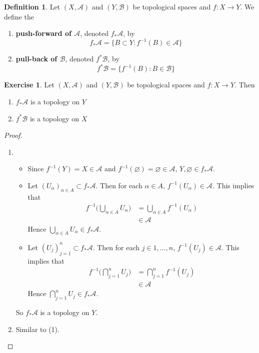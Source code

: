 \documentclass[12pt]{amsart}
\theoremstyle{definition}
\newtheorem{defn}[definition]{Definition}
\newtheorem{ex}[definition]{Exercise}
\newcommand{\al}{\alpha}
\newcommand{\MA}{\mathcal{A}}
\newcommand{\MB}{\mathcal{B}}
\newcommand{\lex}[1]{\label{ex:#1}}
\newcommand{\ld}[1]{\label{defn:#1}}
\begin{document}
	\begin{defn} \ld{}
	Let $(X, \MA)$ and $(Y,\MB)$ be topological spaces and $f: X \rightarrow Y$. We define the 
	\begin{enumerate}
	\item \textbf{push-forward of $\MA$}, denoted $f_*\MA$, by 
	$$f_*\MA = \{B \subset Y: f^{-1}(B) \in \MA\}$$ 
	\item  \textbf{pull-back of $\MB$}, denoted $f^*\MB$, by  
	$$f^*\MB = \{f^{-1}(B):  B \in \MB \}$$
	\end{enumerate}
	\end{defn}
	
	\begin{ex} \lex{} 
		Let $(X,\MA)$ and $(Y,\MB)$ be topological spaces and $f: X \rightarrow Y$. Then 
		\begin{enumerate}
			\item $f_*\MA$ is a topology on $Y$
			\item $f^*\MB$ is a topology on $X$
		\end{enumerate}
	\end{ex}
	
	\begin{proof}\
		\begin{enumerate}
			\item 
			\begin{itemize}
			\item Since $f^{-1}(Y) = X \in \MA$ and $f^{-1}(\varnothing) = \varnothing \in \MA$, $Y, \varnothing \in f_*\MA$.
			\item Let $(U_{\al})_{\al \in A} \subset f_*\MA$. Then for each $\al \in A$, $f^{-1}(U_{\al}) \in \MA$. This implies that 
			\begin{align*}
			f^{-1}\bigg( \bigcup\limits_{\al \in A}U_{\al} \bigg) 
			&=  \bigcup\limits_{\al \in A} f^{-1}(U_{\al}) \\
			& \in \MA
			\end{align*}
			Hence $\bigcup\limits_{\al \in A}U_{\al} \in f_*\MA$.
			\item Let $(U_{j})_{j=1}^n \subset f_*\MA$. Then for each $j \in {1, \ldots, n}$, $f^{-1}(U_{j}) \in \MA$. This implies that 
			\begin{align*}
			f^{-1}\bigg( \bigcap\limits_{j=1}^n U_{j} \bigg) 
			&=  \bigcap\limits_{j=1}^n f^{-1}(U_{j}) \\
			& \in \MA
			\end{align*}
			Hence $\bigcap\limits_{j=1}^n U_{j} \in f_*\MA$.
			\end{itemize}
			So $f_*\MA$ is a topology on $Y$.
			\item Similar to (1).
		\end{enumerate}
	\end{proof}	
	
\end{document}

